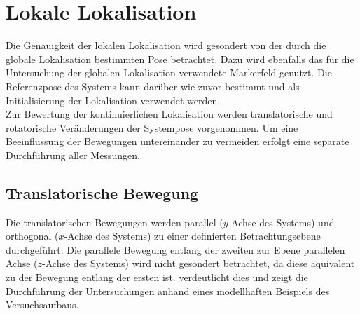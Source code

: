 \prever{
}











\section{Lokale Lokalisation}%
Die Genauigkeit der lokalen Lokalisation wird gesondert von der durch die globale Lokalisation bestimmten Pose betrachtet. Dazu wird ebenfalls das für die Untersuchung der globalen Lokalisation verwendete Markerfeld genutzt. Die Referenzpose des Systems kann darüber wie zuvor bestimmt und als Initialisierung der Lokalisation verwendet werden.\\

Zur Bewertung der kontinuierlichen Lokalisation werden translatorische und rotatorische Veränderungen der Systempose vorgenommen. Um eine Beeinflussung der Bewegungen untereinander zu vermeiden erfolgt eine separate Durchführung aller Messungen.\\

\subsection{Translatorische Bewegung}
Die translatorischen Bewegungen werden parallel ($y$-Achse des Systems) und orthogonal ($x$-Achse des Systems) zu einer definierten Betrachtungsebene durchgeführt. Die parallele Bewegung entlang der zweiten zur Ebene parallelen Achse ($z$-Achse des Systems) wird nicht gesondert betrachtet, da diese äquivalent zu der Bewegung entlang der ersten ist.  verdeutlicht dies und zeigt die Durchführung der Untersuchungen anhand eines modellhaften Beispiels des Versuchsaufbaus.\\

